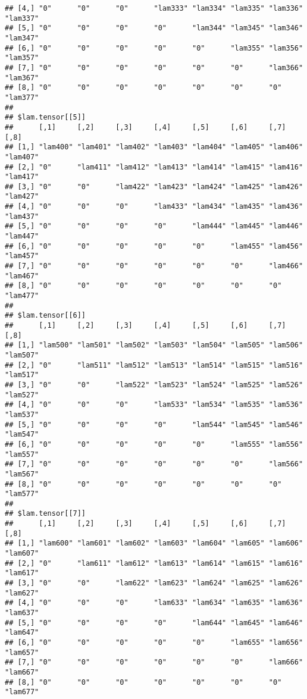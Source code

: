 \documentclass[
]{article}
\begin{document}
\begin{verbatim}
## [4,] "0"      "0"      "0"      "lam333" "lam334" "lam335" "lam336" "lam337"
## [5,] "0"      "0"      "0"      "0"      "lam344" "lam345" "lam346" "lam347"
## [6,] "0"      "0"      "0"      "0"      "0"      "lam355" "lam356" "lam357"
## [7,] "0"      "0"      "0"      "0"      "0"      "0"      "lam366" "lam367"
## [8,] "0"      "0"      "0"      "0"      "0"      "0"      "0"      "lam377"
## 
## $lam.tensor[[5]]
##      [,1]     [,2]     [,3]     [,4]     [,5]     [,6]     [,7]     [,8]    
## [1,] "lam400" "lam401" "lam402" "lam403" "lam404" "lam405" "lam406" "lam407"
## [2,] "0"      "lam411" "lam412" "lam413" "lam414" "lam415" "lam416" "lam417"
## [3,] "0"      "0"      "lam422" "lam423" "lam424" "lam425" "lam426" "lam427"
## [4,] "0"      "0"      "0"      "lam433" "lam434" "lam435" "lam436" "lam437"
## [5,] "0"      "0"      "0"      "0"      "lam444" "lam445" "lam446" "lam447"
## [6,] "0"      "0"      "0"      "0"      "0"      "lam455" "lam456" "lam457"
## [7,] "0"      "0"      "0"      "0"      "0"      "0"      "lam466" "lam467"
## [8,] "0"      "0"      "0"      "0"      "0"      "0"      "0"      "lam477"
## 
## $lam.tensor[[6]]
##      [,1]     [,2]     [,3]     [,4]     [,5]     [,6]     [,7]     [,8]    
## [1,] "lam500" "lam501" "lam502" "lam503" "lam504" "lam505" "lam506" "lam507"
## [2,] "0"      "lam511" "lam512" "lam513" "lam514" "lam515" "lam516" "lam517"
## [3,] "0"      "0"      "lam522" "lam523" "lam524" "lam525" "lam526" "lam527"
## [4,] "0"      "0"      "0"      "lam533" "lam534" "lam535" "lam536" "lam537"
## [5,] "0"      "0"      "0"      "0"      "lam544" "lam545" "lam546" "lam547"
## [6,] "0"      "0"      "0"      "0"      "0"      "lam555" "lam556" "lam557"
## [7,] "0"      "0"      "0"      "0"      "0"      "0"      "lam566" "lam567"
## [8,] "0"      "0"      "0"      "0"      "0"      "0"      "0"      "lam577"
## 
## $lam.tensor[[7]]
##      [,1]     [,2]     [,3]     [,4]     [,5]     [,6]     [,7]     [,8]    
## [1,] "lam600" "lam601" "lam602" "lam603" "lam604" "lam605" "lam606" "lam607"
## [2,] "0"      "lam611" "lam612" "lam613" "lam614" "lam615" "lam616" "lam617"
## [3,] "0"      "0"      "lam622" "lam623" "lam624" "lam625" "lam626" "lam627"
## [4,] "0"      "0"      "0"      "lam633" "lam634" "lam635" "lam636" "lam637"
## [5,] "0"      "0"      "0"      "0"      "lam644" "lam645" "lam646" "lam647"
## [6,] "0"      "0"      "0"      "0"      "0"      "lam655" "lam656" "lam657"
## [7,] "0"      "0"      "0"      "0"      "0"      "0"      "lam666" "lam667"
## [8,] "0"      "0"      "0"      "0"      "0"      "0"      "0"      "lam677"

\end{verbatim}
\end{document}
